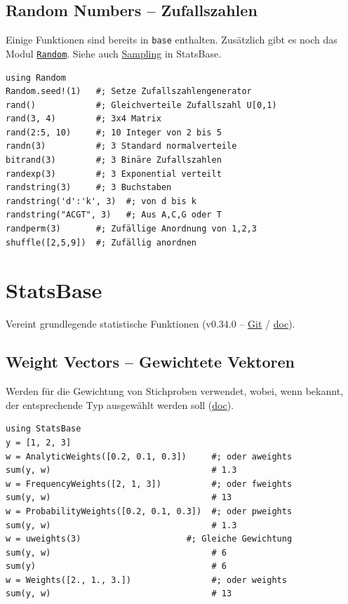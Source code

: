 \documentclass[10pt,twocolumn]{scrartcl}
\begin{document}
\subsection{Random Numbers -- Zufallszahlen}
\label{ssec:standardLibrary_Random}

Einige Funktionen sind bereits in \lstinline|base| enthalten. Zusätzlich gibt es
noch das Modul
\href{https://docs.julialang.org/en/v1/stdlib/Random/}{\lstinline|Random|}.
Siehe auch \hyperref[ssec:StatsBase_Sampling]{Sampling} in StatsBase.

\begin{lstlisting}
using Random
Random.seed!(1)   #; Setze Zufallszahlengenerator
rand()            #; Gleichverteile Zufallszahl U[0,1)
rand(3, 4)        #; 3x4 Matrix
rand(2:5, 10)     #; 10 Integer von 2 bis 5
randn(3)          #; 3 Standard normalverteile
bitrand(3)        #; 3 Binäre Zufallszahlen
randexp(3)        #; 3 Exponential verteilt
randstring(3)     #; 3 Buchstaben
randstring('d':'k', 3)  #; von d bis k
randstring("ACGT", 3)   #; Aus A,C,G oder T
randperm(3)       #; Zufällige Anordnung von 1,2,3
shuffle([2,5,9])  #; Zufällig anordnen
\end{lstlisting}

\section{StatsBase}
\label{sec:StatsBase}

Vereint grundlegende statistische Funktionen (v0.34.0 --
\href{https://github.com/JuliaStats/StatsBase.jl}{Git} /
\href{https://juliastats.org/StatsBase.jl/stable/}{doc}).

\subsection{Weight Vectors -- Gewichtete Vektoren}

Werden für die Gewichtung von Stichproben verwendet, wobei, wenn bekannt, der
entsprechende Typ ausgewählt werden soll
(\href{https://juliastats.org/StatsBase.jl/stable/weights/}{doc}).

\begin{lstlisting}
using StatsBase
y = [1, 2, 3]
w = AnalyticWeights([0.2, 0.1, 0.3])     #; oder aweights
sum(y, w)                                # 1.3
w = FrequencyWeights([2, 1, 3])          #; oder fweights
sum(y, w)                                # 13
w = ProbabilityWeights([0.2, 0.1, 0.3])  #; oder pweights
sum(y, w)                                # 1.3
w = uweights(3)                     #; Gleiche Gewichtung
sum(y, w)                                # 6
sum(y)                                   # 6
w = Weights([2., 1., 3.])                #; oder weights
sum(y, w)                                # 13
\end{lstlisting}
\end{document}
